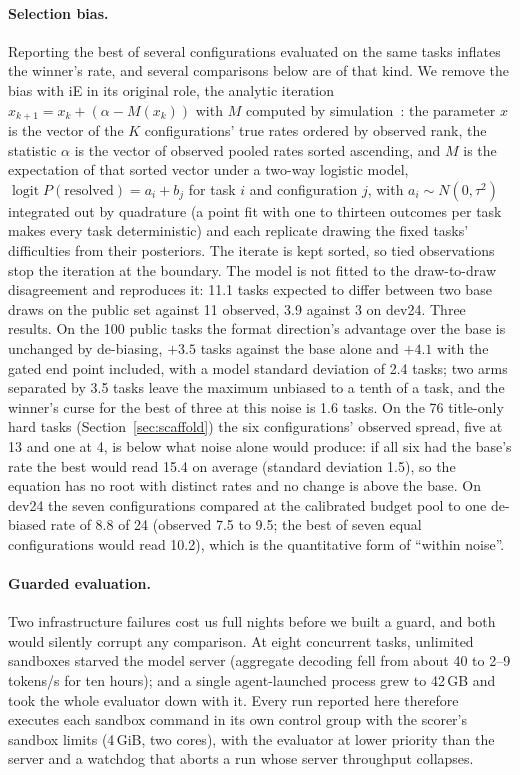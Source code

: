 \documentclass[11pt]{article}
\begin{document}
\paragraph{Selection bias.} Reporting the best of several configurations evaluated on the same tasks inflates the winner's rate, and several comparisons below are of that kind. We remove the bias with iE in its original role, the analytic iteration $x_{k+1} = x_k + (\alpha - M(x_k))$ with $M$ computed by simulation~\citep[Section~3.3]{qin2025ie}: the parameter $x$ is the vector of the $K$ configurations' true rates ordered by observed rank, the statistic $\alpha$ is the vector of observed pooled rates sorted ascending, and $M$ is the expectation of that sorted vector under a two-way logistic model, $\operatorname{logit} P(\text{resolved}) = a_i + b_j$ for task $i$ and configuration $j$, with $a_i \sim N(0, \tau^2)$ integrated out by quadrature (a point fit with one to thirteen outcomes per task makes every task deterministic) and each replicate drawing the fixed tasks' difficulties from their posteriors. The iterate is kept sorted, so tied observations stop the iteration at the boundary. The model is not fitted to the draw-to-draw disagreement and reproduces it: 11.1 tasks expected to differ between two base draws on the public set against 11 observed, 3.9 against 3 on dev24. Three results. On the 100 public tasks the format direction's advantage over the base is unchanged by de-biasing, $+3.5$ tasks against the base alone and $+4.1$ with the gated end point included, with a model standard deviation of 2.4 tasks; two arms separated by 3.5 tasks leave the maximum unbiased to a tenth of a task, and the winner's curse for the best of three at this noise is 1.6 tasks. On the 76 title-only hard tasks (Section~\ref{sec:scaffold}) the six configurations' observed spread, five at 13 and one at 4, is below what noise alone would produce: if all six had the base's rate the best would read 15.4 on average (standard deviation 1.5), so the equation has no root with distinct rates and no change is above the base. On dev24 the seven configurations compared at the calibrated budget pool to one de-biased rate of 8.8 of 24 (observed 7.5 to 9.5; the best of seven equal configurations would read 10.2), which is the quantitative form of ``within noise''.

\paragraph{Guarded evaluation.} Two infrastructure failures cost us full nights before we built a guard, and both would silently corrupt any comparison. At eight concurrent tasks, unlimited sandboxes starved the model server (aggregate decoding fell from about 40 to 2--9 tokens/s for ten hours); and a single agent-launched process grew to 42\,GB and took the whole evaluator down with it. Every run reported here therefore executes each sandbox command in its own control group with the scorer's sandbox limits (4\,GiB, two cores), with the evaluator at lower priority than the server and a watchdog that aborts a run whose server throughput collapses.
\end{document}
